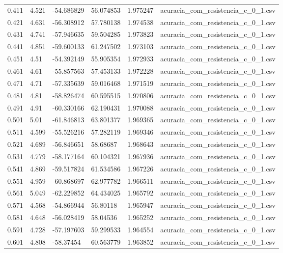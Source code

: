 \begin{table}
\begin{tabular}{llllll}
0.411 & 4.521 & -54.686829 & 56.074853 & 1.975247 & acuracia\_com\_resistencia\_c\_0\_1.csv \\
0.421 & 4.631 & -56.308912 & 57.780138 & 1.974538 & acuracia\_com\_resistencia\_c\_0\_1.csv \\
0.431 & 4.741 & -57.946635 & 59.504285 & 1.973823 & acuracia\_com\_resistencia\_c\_0\_1.csv \\
0.441 & 4.851 & -59.600133 & 61.247502 & 1.973103 & acuracia\_com\_resistencia\_c\_0\_1.csv \\
0.451 & 4.51 & -54.392149 & 55.905354 & 1.972933 & acuracia\_com\_resistencia\_c\_0\_1.csv \\
0.461 & 4.61 & -55.857563 & 57.453133 & 1.972228 & acuracia\_com\_resistencia\_c\_0\_1.csv \\
0.471 & 4.71 & -57.335639 & 59.016468 & 1.971519 & acuracia\_com\_resistencia\_c\_0\_1.csv \\
0.481 & 4.81 & -58.826474 & 60.595515 & 1.970806 & acuracia\_com\_resistencia\_c\_0\_1.csv \\
0.491 & 4.91 & -60.330166 & 62.190431 & 1.970088 & acuracia\_com\_resistencia\_c\_0\_1.csv \\
0.501 & 5.01 & -61.846813 & 63.801377 & 1.969365 & acuracia\_com\_resistencia\_c\_0\_1.csv \\
0.511 & 4.599 & -55.526216 & 57.282119 & 1.969346 & acuracia\_com\_resistencia\_c\_0\_1.csv \\
0.521 & 4.689 & -56.846651 & 58.68687 & 1.968643 & acuracia\_com\_resistencia\_c\_0\_1.csv \\
0.531 & 4.779 & -58.177164 & 60.104321 & 1.967936 & acuracia\_com\_resistencia\_c\_0\_1.csv \\
0.541 & 4.869 & -59.517824 & 61.534586 & 1.967226 & acuracia\_com\_resistencia\_c\_0\_1.csv \\
0.551 & 4.959 & -60.868697 & 62.977782 & 1.966511 & acuracia\_com\_resistencia\_c\_0\_1.csv \\
0.561 & 5.049 & -62.229852 & 64.434025 & 1.965792 & acuracia\_com\_resistencia\_c\_0\_1.csv \\
0.571 & 4.568 & -54.866944 & 56.80118 & 1.965947 & acuracia\_com\_resistencia\_c\_0\_1.csv \\
0.581 & 4.648 & -56.028419 & 58.04536 & 1.965252 & acuracia\_com\_resistencia\_c\_0\_1.csv \\
0.591 & 4.728 & -57.197603 & 59.299533 & 1.964554 & acuracia\_com\_resistencia\_c\_0\_1.csv \\
0.601 & 4.808 & -58.37454 & 60.563779 & 1.963852 & acuracia\_com\_resistencia\_c\_0\_1.csv \\

\end{tabular}
\end{table}
